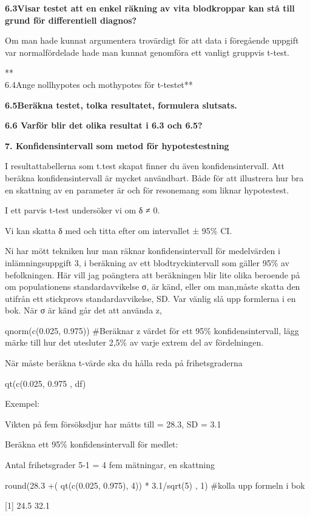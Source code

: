 \documentclass[
  letterpaper,
  DIV=11,
  numbers=noendperiod]{scrartcl}
\begin{document}
\textbf{6.3Visar testet att en enkel räkning av vita blodkroppar kan stå
till grund för differentiell diagnos?}

Om man hade kunnat argumentera trovärdigt för att data i föregående
uppgift var normalfördelade hade man kunnat genomföra ett vanligt
gruppvis t-test.

**\\
6.4Ange nollhypotes och mothypotes för t-testet**

\textbf{6.5Beräkna testet, tolka resultatet, formulera slutsats.}

\textbf{6.6 Varför blir det olika resultat i 6.3 och 6.5?}

\textbf{7. Konfidensintervall som metod för hypotestestning}

I resultattabellerna som t.test skapat finner du även
konfidensintervall. Att beräkna konfidensintervall är mycket användbart.
Både för att illustrera hur bra en skattning av en parameter är och för
resonemang som liknar hypotestest.

I ett parvis t-test undersöker vi om δ ≠ 0.

Vi kan skatta δ med och titta efter om intervallet ± 95\% CI.

Ni har mött tekniken hur man räknar konfidensintervall för medelvärden i
inlämningsuppgift 3, i beräkning av ett blodtryckintervall som gäller
95\% av befolkningen. Här vill jag poängtera att beräkningen blir lite
olika beroende på om populationens standardavvikelse σ, är känd, eller
om man,måste skatta den utifrån ett stickprovs standardavvikelse, SD.
Var vänlig slå upp formlerna i en bok. När σ är känd går det att använda
z,

qnorm(c(0.025, 0.975)) \#Beräknar z värdet för ett 95\%
konfidensintervall, lägg märke till hur det utesluter 2,5\% av varje
extrem del av fördelningen.

När måste beräkna t-värde ska du hålla reda på frihetsgraderna

qt(c(0.025, 0.975 , df)

Exempel:

Vikten på fem försöksdjur har mätts till = 28.3, SD = 3.1

Beräkna ett 95\% konfidensintervall för medlet:

Antal frihetsgrader 5-1 = 4 fem mätningar, en skattning

round(28.3 +( qt(c(0.025, 0.975), 4)) * 3.1/sqrt(5) , 1) \#kolla upp
formeln i bok

{[}1{]} 24.5 32.1
\end{document}
